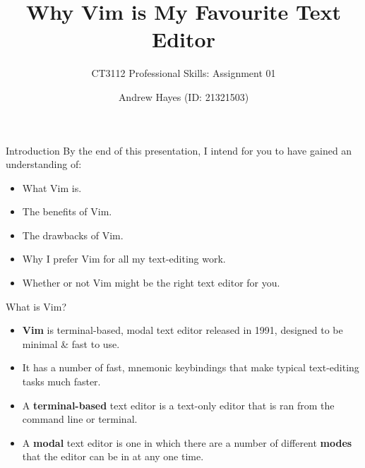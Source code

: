 \documentclass[]{beamer}
\author{Andrew Hayes (ID: 21321503)}
\title{Why Vim is My Favourite Text Editor}
\subtitle{CT3112 Professional Skills: Assignment 01}
\institute{University of Galway}
\begin{document}
\frame{\titlepage}

\begin{frame}{Introduction}
    By the end of this presentation, I intend for you to have gained an understanding of:
    \begin{itemize}
        \item   What Vim is.
        \item   The benefits of Vim.
        \item   The drawbacks of Vim.
        \item   Why I prefer Vim for all my text-editing work.
        \item   Whether or not Vim might be the right text editor for you.
    \end{itemize}
\end{frame}

\begin{frame}{What is Vim?}
    \begin{itemize}
        \item   \textbf{Vim} is terminal-based, modal text editor released in 1991, designed to be minimal \& fast to
                use.
        \item   It has a number of fast, mnemonic keybindings that make typical text-editing tasks much faster.
        \item   A \textbf{terminal-based} text editor is a text-only editor that is ran from the command line or
                terminal.
        \item   A \textbf{modal} text editor is one in which there are a number of different \textbf{modes} that the 
                editor can be in at any one time. 
    \end{itemize}
\end{frame}
\end{document}
